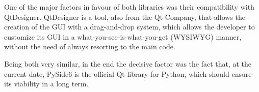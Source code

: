 One of the major factors in favour of both libraries was their compatibility with QtDesigner. QtDesigner is a tool, also from the Qt Company, that allows the creation of the GUI with a drag-and-drop system, which allows the developer to customize its GUI in a what-you-see-is-what-you-get (WYSIWYG) manner, without the need of always resorting to the main code.

Being both very similar, in the end the decisive factor was the fact that, at the current date, PySide6 is the official Qt library for Python, which should ensure its viability in a long term.










